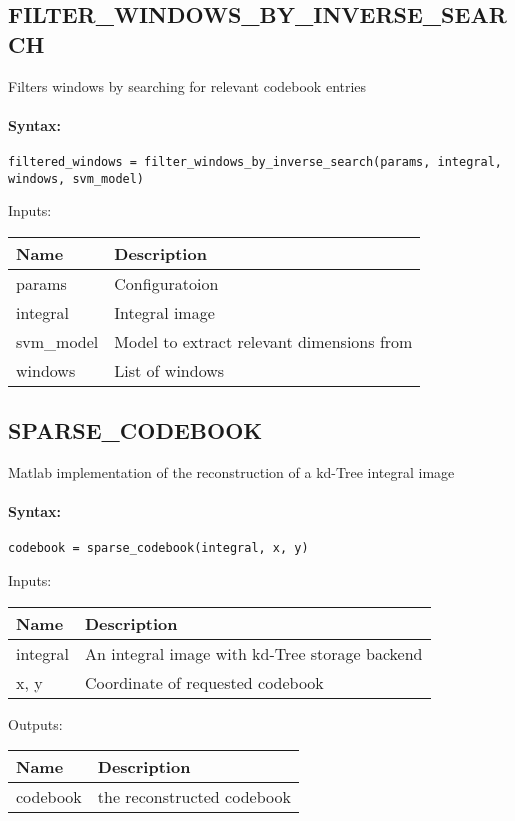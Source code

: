 \subsection{FILTER\_WINDOWS\_BY\_INVERSE\_SEARCH}

Filters windows by searching for relevant codebook entries

\paragraph{Syntax:} \verb|filtered_windows = filter_windows_by_inverse_search(params, integral, windows, svm_model)|

\bigskip
Inputs:

\begin{tabular}{|p{}|p{}|}
\hline
\textbf{Name} & \textbf{Description} \\
\hline \hline
params & Configuratoion  \\ \hline
integral & Integral image  \\ \hline
svm\_model & Model to extract relevant dimensions from  \\ \hline
windows & List of windows  \\ \hline
\end{tabular}


\subsection{SPARSE\_CODEBOOK}

Matlab implementation of the reconstruction of a kd-Tree integral image

\paragraph{Syntax:} \verb|codebook = sparse_codebook(integral, x, y)|

\bigskip
Inputs:

\begin{tabular}{|p{}|p{}|}
\hline
\textbf{Name} & \textbf{Description} \\
\hline \hline
integral & An integral image with kd-Tree storage backend  \\ \hline
x, y & Coordinate of requested codebook  \\ \hline
\end{tabular}

\bigskip
Outputs:

\begin{tabular}{|p{}|p{}|}
\hline
\textbf{Name} & \textbf{Description} \\
\hline \hline
codebook & the reconstructed codebook  \\ \hline
\end{tabular}

